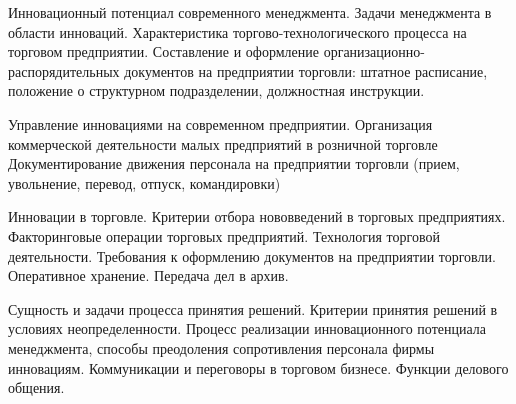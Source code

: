\documentclass[
	11pt,
	a4paper,
	]
	{article}
\begin{document}
\bigskip

\noindent{} 
	{
		Инновационный потенциал современного менеджмента. Задачи менеджмента в области инноваций.
	}{
		Характеристика торгово-технологического процесса на торговом предприятии.
	}{
		Составление и оформление организационно-распорядительных документов на предприятии торговли: штатное расписание, положение о структурном подразделении, должностная инструкции.
	}

\bigskip

\noindent{} 
	{
		Управление инновациями на современном предприятии.
	}{
		Организация коммерческой деятельности малых предприятий в розничной торговле
	}{
		Документирование движения персонала на предприятии торговли (прием, увольнение, перевод, отпуск, командировки)
	}

\bigskip

\noindent{} 
	{
		Инновации в торговле. Критерии отбора нововведений в торговых предприятиях.
	}{
		Факторинговые операции торговых предприятий. Технология торговой деятельности.
	}{
		Требования к оформлению документов на предприятии торговли. Оперативное хранение. Передача дел в архив.
	}

\bigskip

\noindent{} 
	{
		Сущность и задачи процесса принятия решений. Критерии принятия решений в условиях неопределенности.
	}{
		Процесс реализации инновационного потенциала менеджмента, способы преодоления сопротивления персонала фирмы инновациям.
	}{
		Коммуникации и переговоры в торговом бизнесе. Функции делового общения.
	}

\bigskip
\end{document}
